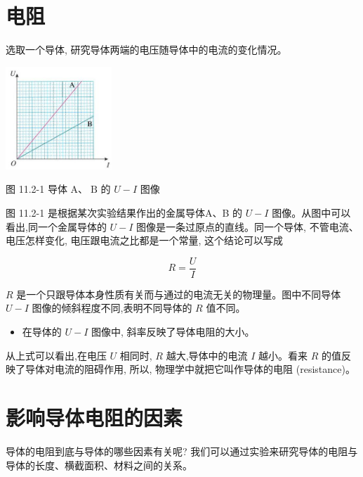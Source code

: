 \documentclass[10pt]{article}
\begin{document}
\section*{电阻}

选取一个导体, 研究导体两端的电压随导体中的电流的变化情况。

\begin{center}
\includegraphics[max width=0.3\textwidth]{images/01911d5f-8e38-70c0-b5b8-2b399bd115b6_62_994074.jpg}
\end{center}

图 11.2-1 导体 \(\mathrm{A}\text{、}\mathrm{\;B}\) 的 \(U - I\) 图像

图 11.2-1 是根据某次实验结果作出的金属导体A、B 的 \(U - I\) 图像。从图中可以看出,同一个金属导体的 \(U - I\) 图像是一条过原点的直线。同一个导体, 不管电流、电压怎样变化, 电压跟电流之比都是一个常量, 这个结论可以写成

\[
R = \frac{U}{I}
\]

\(R\) 是一个只跟导体本身性质有关而与通过的电流无关的物理量。图中不同导体 \(U - I\) 图像的倾斜程度不同,表明不同导体的 \(R\) 值不同。

\begin{mdframed}

\begin{itemize}
\item 在导体的 \(U - I\) 图像中, 斜率反映了导体电阻的大小。
\end{itemize}

\end{mdframed}

从上式可以看出,在电压 \(U\) 相同时, \(R\) 越大,导体中的电流 \(I\) 越小。看来 \(R\) 的值反映了导体对电流的阻碍作用, 所以, 物理学中就把它叫作导体的电阻 (resistance)。

\section*{影响导体电阻的因素}

导体的电阻到底与导体的哪些因素有关呢? 我们可以通过实验来研究导体的电阻与导体的长度、横截面积、材料之间的关系。
\end{document}
